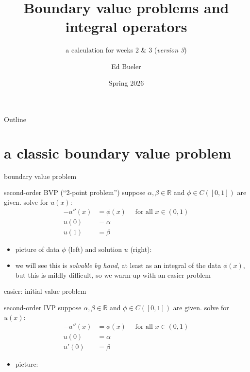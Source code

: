 \documentclass[10pt,
               svgnames,
               hyperref={colorlinks,
                         citecolor=DeepPink4,
                         linkcolor=FireBrick,
                         urlcolor=Maroon},
               usepdftitle=false]{beamer}
\title{Boundary value problems and integral operators}
\subtitle{a calculation for weeks 2 \& 3 \quad (\emph{version 3})}
\author{Ed Bueler}
\institute[]{UAF Math 617 Functional Analysis}
\date{Spring 2026}
\newcommand{\RR}{\mathbb{R}}
\begin{document}
\beamertemplatenavigationsymbolsempty

\begin{frame}
  \maketitle
\end{frame}


\begin{frame}{Outline}
  \tableofcontents[hideallsubsections]
\end{frame}

\AtBeginSection[]
{%
}


\section{a classic boundary value problem}

\begin{frame}{boundary value problem}

\begin{block}{second-order BVP (``2-point problem'')}
suppose $\alpha,\beta\in\RR$ and $\phi \in C([0,1])$ are given.  solve for $u(x)$:
\begin{align*}
-u''(x) &= \phi(x) \quad \text{ for all } x\in (0,1) \\
u(0) &= \alpha \\
u(1) &= \beta
\end{align*}
\end{block}

\begin{itemize}
\item picture of data $\phi$ (left) and solution $u$ (right):

\vspace{30mm}
\item we will see this is \emph{solvable by hand}, at least as an integral of the data $\phi(x)$, but this is mildly difficult, so we warm-up with an easier problem
\end{itemize}
\end{frame}


\begin{frame}{easier: initial value problem}

\begin{block}{second-order IVP\phantom{p}}
suppose $\alpha,\beta\in\RR$ and $\phi \in C([0,1])$ are given.  solve for $u(x)$:
\begin{align*}
-u''(x) &= \phi(x) \quad \text{ for all } x\in (0,1) \\
u(0) &= \alpha \\
u'(0) &= \beta
\end{align*}
\end{block}

\begin{itemize}
\item picture:

\vspace{39mm}
\end{itemize}
\end{frame}
\end{document}
